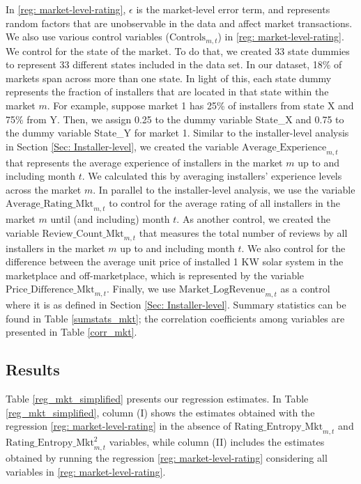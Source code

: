 \documentclass[msom,blindrev]{informs3}
\begin{document}
	
	In \eqref{reg: market-level-rating}, $\epsilon$ is the market-level error term, and represents random factors that are unobservable in the data and affect market transactions. We also use various control variables ($\text{Controls}_{m,t}$) in \eqref{reg: market-level-rating}. We control for the state of the market. To do that, we created 33 state dummies to represent 33 different states included in the data set. In our dataset, 18\% of markets span across more than one state.  In light of this, each state dummy represents the fraction of installers that are located in that state within the market $m$. For example, suppose market 1 has 25\% of installers from state X and 75\% from Y. Then, we assign 0.25 to the dummy variable State\_X and 0.75 to the dummy variable State\_Y for market 1.  Similar to the installer-level analysis in Section \ref{Sec: Installer-level}, we created the variable $\text{Average\_Experience}_{m,t}$ that represents the average experience of installers in the market $m$ up to and including month $t$. We calculated this by averaging installers' experience levels across the market $m$. In parallel to the installer-level analysis, we use the variable $\text{Average\_Rating\_Mkt}_{m,t}$ to control for the average rating of all installers in the market $m$ until (and including) month $t$. As another control, we created the variable $\text{Review\_Count\_Mkt}_{m,t}$ that measures the total number of reviews by all installers in the market $m$ up to and including month $t$. We also control for the difference between the average unit price of installed 1 KW solar system in the marketplace and off-marketplace, which is represented by the variable $\text{Price\_Difference\_Mkt}_{m,t}$. Finally, we use $\text{Market\_LogRevenue}_{m,t}$ as a control where it is as defined in Section \ref{Sec: Installer-level}. Summary statistics can be found in Table \ref{sumstats_mkt}; the correlation coefficients among variables are presented in Table \ref{corr_mkt}.
	
	
	
	\subsection{Results}
	
	
	Table \ref{reg_mkt_simplified} presents our regression estimates. In Table \ref{reg_mkt_simplified}, column (I) shows the estimates obtained with the regression \eqref{reg: market-level-rating} in the absence of $\text{Rating\_Entropy\_Mkt}_{m,t}$ and $\text{Rating\_Entropy\_Mkt}^2_{m,t}$ variables, while column (II) includes the estimates obtained by running the regression \eqref{reg: market-level-rating} considering all variables in \eqref{reg: market-level-rating}.
	
	
	
	
\end{document}
